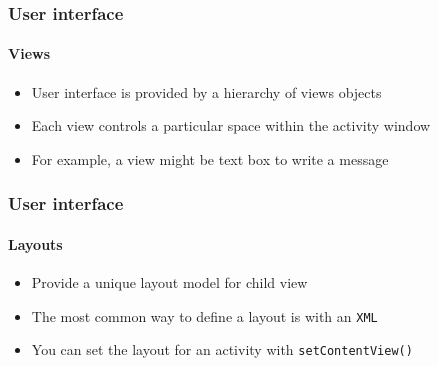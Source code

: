 %
%

\begin{frame}
  \frametitle{User interface}
  \framesubtitle{Views}


  \begin{itemize}
  \item<1-> User interface is provided by a hierarchy of views objects
  \item<2-> Each view controls a particular space within the activity
    window
  \item<3-> For example, a view might be text box to write a message
  \end{itemize}

\end{frame}

\begin{frame}
  \frametitle{User interface}
  \framesubtitle{Layouts}


  \begin{itemize}
  \item<1-> Provide a unique layout model for child view
  \item<2-> The most common way to define a layout is with an \texttt{XML}
  \item<3-> You can set the layout for an activity with
    \lstinline{setContentView()}
  \end{itemize}

\end{frame}


